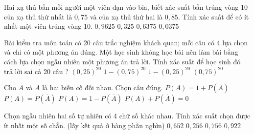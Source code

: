 \begin{ex}
Hai xạ thủ bắn mỗi người một viên đạn vào bia, biết xác suất bắn trúng vòng 10 của xạ thủ thứ nhất là $0{,}75$ và của xạ thủ thứ hai là $0{,}85$. Tính xác suất để có ít nhất một viên trúng vòng 10.
\choice
{$0{,}9625$}
{$0{,}325$}
{\True $0{,}6375$}
{$0{,}0375$}
\end{ex}
\begin{ex}
Bài kiểm tra môn toán có 20 câu trắc nghiệm khách quan; mỗi câu có 4 lựa chọn và chỉ có một phương án đúng. Một học sinh không học bài nên làm bài bằng cách lựa chọn ngẫu nhiên một phương án trả lời. Tính xác suất để học sinh đó trả lời sai cả 20 câu ?
\choice
{$\left(0{,}25\right)^20$}
{$1-\left(0{,}75\right)^20$}
{$1-\left(0{,}25\right)^20$}
{\True $(0{,}75)^20$}
\end{ex}
\begin{ex}
Cho $A$ và $\overline{A}$ là hai biến cố đối nhau. Chọn câu đúng.
\choice
{$P(A)=1+P\left(\overline{A}\right)$}
{$P(A)=P\left(\overline{A}\right)$}
{\True $P(A)=1-P\left(\overline{A}\right)$}
{$P(A)+P\left(\overline{A}\right)=0$}
\loigiai{ }
\end{ex}
\begin{ex}
Chọn ngẫu nhiên hai số tự nhiên có 4 chữ số khác nhau. Tính xác suất chọn được ít nhất một số chẵn. (lấy kết quả ở hàng phần nghìn)
\choice
{$0{,}652$}
{$0{,}256$}
{$0{,}756$}
{\True $0{,}922$}
\end{ex}
